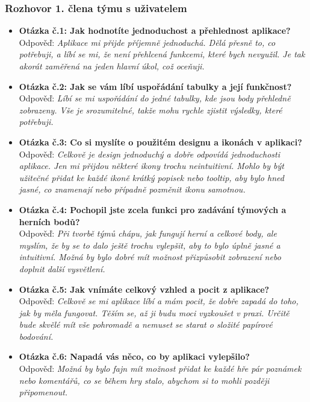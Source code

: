 \documentclass[a4paper, 12pt]{article} %
\begin{document}
\subsubsection{Rozhovor 1. člena týmu s uživatelem}
\begin{itemize}
    \item \textbf{Otázka č.1: Jak hodnotíte jednoduchost a přehlednost aplikace?} \\
    Odpověď: \textit{Aplikace mi přijde příjemně jednoduchá. Dělá přesně to, co potřebuji, 
    a líbí se mi, že není přehlcená funkcemi, které bych nevyužil. Je tak akorát zaměřená na 
    jeden hlavní úkol, což oceňuji.}

    \item \textbf{Otázka č.2: Jak se vám líbí uspořádání tabulky a její funkčnost?} \\
    Odpověď: \textit{Líbí se mi uspořádání do jedné tabulky, kde jsou body přehledně zobrazeny. 
    Vše je srozumitelné, takže mohu rychle zjistit výsledky, které potřebuji.}

    \item \textbf{Otázka č.3: Co si myslíte o použitém designu a ikonách v aplikaci?} \\
    Odpověď: \textit{Celkově je design jednoduchý a dobře odpovídá jednoduchosti aplikace. 
    Jen mi přijdou některé ikony trochu neintuitivní. Mohlo by být užitečné přidat ke každé 
    ikoně krátký popisek nebo tooltip, aby bylo hned jasné, co znamenají nebo případně pozměnit 
    ikonu samotnou.}

    \item \textbf{Otázka č.4: Pochopil jste zcela funkci pro zadávání týmových a herních bodů?} \\
    Odpověď: \textit{Při tvorbě týmů chápu, jak fungují herní a celkové body, ale myslím, že 
    by se to dalo ještě trochu vylepšit, aby to bylo úplně jasné a intuitivní. Možná by bylo 
    dobré mít možnost přizpůsobit zobrazení nebo doplnit další vysvětlení.}

    \item \textbf{Otázka č.5: Jak vnímáte celkový vzhled a pocit z aplikace?} \\
    Odpověď: \textit{Celkově se mi aplikace líbí a mám pocit, že dobře zapadá do toho, jak by 
    měla fungovat. Těším se, až ji budu moci vyzkoušet v praxi. Určitě bude skvělé mít vše 
    pohromadě a nemuset se starat o složité papírové bodování.}

    \item \textbf{Otázka č.6: Napadá vás něco, co by aplikaci vylepšilo?} \\
    Odpověď: \textit{Možná by bylo fajn mít možnost přidat ke každé hře pár poznámek nebo 
    komentářů, co se během hry stalo, abychom si to mohli později připomenout.}


\end{itemize}
\end{document}
